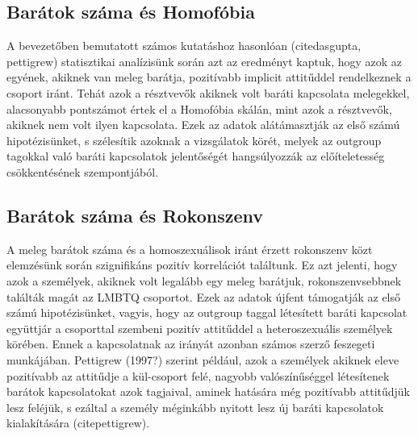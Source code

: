 \subsection{Barátok száma és Homofóbia}
A bevezetőben bemutatott számos kutatáshoz hasonlóan (citedasgupta, pettigrew) statisztikai analízisünk során azt az eredményt kaptuk, hogy azok az egyének, akiknek van meleg barátja, pozitívabb implicit attitűddel rendelkeznek a csoport iránt.  Tehát azok a résztvevők akiknek volt baráti kapcsolata melegekkel, alacsonyabb pontszámot értek el a Homofóbia skálán, mint azok a résztvevők, akiknek nem volt ilyen kapcsolata. Ezek az adatok alátámasztják az első számú hipotézisünket, s szélesítik azoknak a vizsgálatok körét, melyek az outgroup tagokkal való baráti kapcsolatok jelentőségét hangsúlyozzák az előíteletesség csökkentésének szempontjából.

\subsection{Barátok száma és Rokonszenv}
A meleg barátok száma és a homoszexuálisok iránt érzett rokonszenv közt elemzésünk során  szignifikáns pozitív korrelációt találtunk. Ez azt jelenti, hogy azok a személyek, akiknek volt  legalább egy meleg barátjuk, rokonszenvsebbnek találták magát az LMBTQ csoportot. Ezek az adatok újfent támogatják az első számú hipotézisünket, vagyis, hogy az outgroup taggal létesített baráti kapcsolat együttjár a csoporttal szembeni pozitív attitűddel a heteroszexuális személyek körében. Ennek a kapcsolatnak az irányát azonban számos szerző feszegeti munkájában. Pettigrew (1997?) szerint például, azok a személyek akiknek eleve pozitívabb az attitűdje a kül-csoport felé, nagyobb valószínűséggel létesítenek barátok kapcsolatokat azok tagjaival, aminek hatására még pozitívabb attitűdjük lesz feléjük, s ezáltal a személy méginkább nyitott lesz új baráti kapcsolatok kialakítására (citepettigrew).

